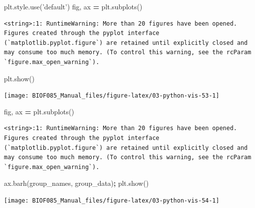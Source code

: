 \documentclass[
  letterpaper,
]{scrbook}
\newenvironment{Shaded}{\begin{snugshade}}{\end{snugshade}}
\newcommand{\NormalTok}[1]{#1}
\newcommand{\OperatorTok}[1]{\textcolor[rgb]{0.81,0.36,0.00}{\textbf{#1}}}
\newcommand{\StringTok}[1]{\textcolor[rgb]{0.31,0.60,0.02}{#1}}
\begin{document}
\begin{Shaded}
\begin{Highlighting}[]
\NormalTok{plt.style.use(}\StringTok{'default'}\NormalTok{)}
\NormalTok{fig, ax }\OperatorTok{=}\NormalTok{ plt.subplots()}
\end{Highlighting}
\end{Shaded}

\begin{verbatim}
<string>:1: RuntimeWarning: More than 20 figures have been opened. Figures created through the pyplot interface (`matplotlib.pyplot.figure`) are retained until explicitly closed and may consume too much memory. (To control this warning, see the rcParam `figure.max_open_warning`).
\end{verbatim}

\begin{Shaded}
\begin{Highlighting}[]
\NormalTok{plt.show()}
\end{Highlighting}
\end{Shaded}

\begin{center}\texttt{[image: BIOF085\_Manual\_files/figure-latex/03-python-vis-53-1]} \end{center}

\begin{Shaded}
\begin{Highlighting}[]
\NormalTok{fig, ax }\OperatorTok{=}\NormalTok{ plt.subplots()}
\end{Highlighting}
\end{Shaded}

\begin{verbatim}
<string>:1: RuntimeWarning: More than 20 figures have been opened. Figures created through the pyplot interface (`matplotlib.pyplot.figure`) are retained until explicitly closed and may consume too much memory. (To control this warning, see the rcParam `figure.max_open_warning`).
\end{verbatim}

\begin{Shaded}
\begin{Highlighting}[]
\NormalTok{ax.barh(group_names, group_data)}\OperatorTok{;}
\NormalTok{plt.show()}
\end{Highlighting}
\end{Shaded}

\begin{center}\texttt{[image: BIOF085\_Manual\_files/figure-latex/03-python-vis-54-1]} \end{center}
\end{document}
